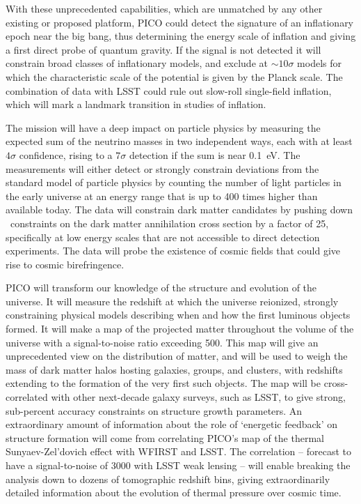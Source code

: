 \documentclass[PICOReport.tex]{subfiles}
\begin{document}
With these unprecedented capabilities, which are unmatched by any other existing or proposed platform, PICO could detect the signature of an inflationary epoch near the big bang, thus determining the energy scale of inflation and giving a first direct probe of quantum gravity. If the signal is not detected it will constrain broad classes of inflationary models, and exclude at $\sim10\sigma$ models for which the characteristic scale of the potential is given by the Planck scale. The combination of data with LSST could rule out slow-roll single-field inflation, which will mark a landmark transition in studies of inflation. 

The mission will have a deep impact on particle physics by measuring the expected sum of the neutrino masses in two independent ways, each with at least $4\sigma$ confidence, rising to a $7\sigma$ detection if the sum is near 0.1~eV. The measurements will either detect or strongly constrain deviations from the standard model of particle physics by counting the number of light particles in the early universe at an energy range that is up to 400 times higher than available today. The data will constrain dark matter candidates by pushing down \planck\ constraints on the dark matter annihilation cross section by a factor of 25, specifically at low energy scales that are not accessible to direct detection experiments. The data will probe the existence of cosmic fields that could give rise to cosmic birefringence. 

PICO will transform our knowledge of the structure and evolution of the universe. It will measure the redshift at which the universe reionized, strongly constraining physical models describing when and how the first luminous objects formed. It will make a map of the projected matter throughout the volume of the universe with a signal-to-noise ratio exceeding 500. This map will give an unprecedented view on the distribution of matter, and will be used to weigh the mass of dark matter halos hosting galaxies, groups, and clusters, with redshifts extending to the formation of the very first such objects. The map will be cross-correlated with other next-decade galaxy surveys, such as LSST, to give strong, sub-percent accuracy constraints on structure growth parameters.  An extraordinary amount of information about the role of `energetic feedback' on structure formation will come from correlating PICO's map of the thermal Sunyaev-Zel'dovich effect with WFIRST and LSST. The correlation -- forecast to have a signal-to-noise of 3000 with LSST weak lensing -- will enable breaking the analysis down to dozens of tomographic redshift bins, giving extraordinarily detailed information about the evolution of thermal pressure over cosmic time. 
\end{document}
